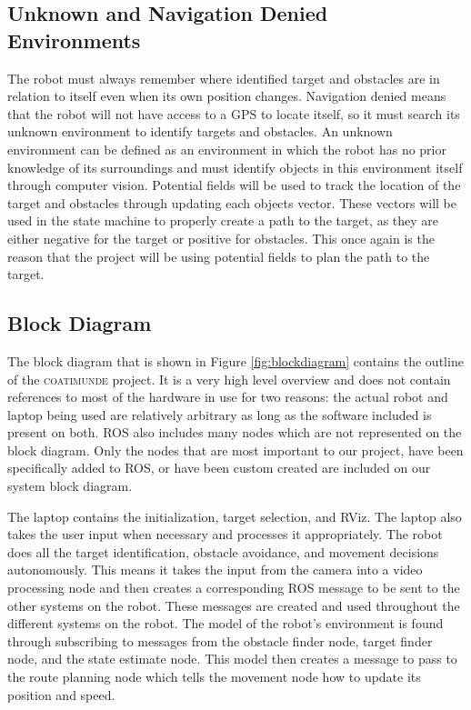 \documentclass{article}[12]
\begin{document}
	\subsection{Unknown and Navigation Denied Environments}

	The robot must always remember where identified target and obstacles are in relation to itself even when its own position changes. Navigation denied means that the robot will not have access to a GPS to locate itself, so it must search its unknown environment to identify targets and obstacles. An unknown environment can be defined as an environment in which the robot has no prior knowledge of its surroundings and must identify objects in this environment itself through computer vision. Potential fields will be used to track the location of the target and obstacles through updating each objects vector. These vectors will be used in the state machine to properly create a path to the target, as they are either negative for the target or positive for obstacles. This once again is the reason that the project will be using potential fields to plan the path to the target. 


	\subsection{Block Diagram}
	
	The block diagram that is shown in Figure \ref{fig:blockdiagram} contains the outline of the \textsc{coatimunde} project. It is a very high level overview and does not contain references to most of the hardware in use for two reasons: the actual robot and laptop being used are relatively arbitrary as long as the software included is present on both. ROS also includes many nodes which are not represented on the block diagram. Only the nodes that are most important to our project, have been specifically added to ROS, or have been custom created are included on our system block diagram.
	
	The laptop contains the initialization, target selection, and RViz. The laptop also takes the user input when necessary and processes it appropriately.  The robot does all the target identification, obstacle avoidance, and movement decisions autonomously. This means it takes the input from the camera into a video processing node and then creates a corresponding ROS message to be sent to the other systems on the robot. These messages are created and used throughout the different systems on the robot. The model of the robot's environment is found through subscribing to messages from the obstacle finder node, target finder node, and the state estimate node. This model then creates a message to pass to the route planning node which tells the movement node how to update its position and speed. 
	
\end{document}
